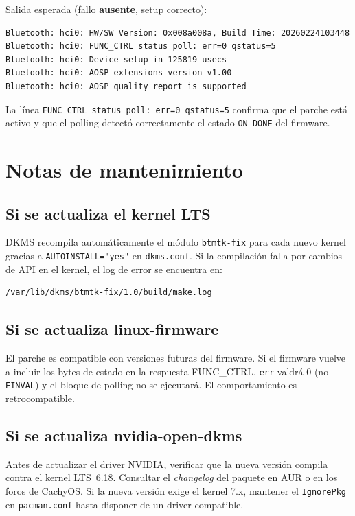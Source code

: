 \documentclass[12pt,a4paper]{article}
\begin{document}
Salida esperada (fallo \textbf{ausente}, setup correcto):

\begin{lstlisting}[style=bash]
Bluetooth: hci0: HW/SW Version: 0x008a008a, Build Time: 20260224103448
Bluetooth: hci0: FUNC_CTRL status poll: err=0 qstatus=5
Bluetooth: hci0: Device setup in 125819 usecs
Bluetooth: hci0: AOSP extensions version v1.00
Bluetooth: hci0: AOSP quality report is supported
\end{lstlisting}

La línea \texttt{FUNC\_CTRL status poll: err=0 qstatus=5} confirma que el
parche está activo y que el polling detectó correctamente el estado
\texttt{ON\_DONE} del firmware.

\section{Notas de mantenimiento}

\subsection{Si se actualiza el kernel LTS}

DKMS recompila automáticamente el módulo \texttt{btmtk-fix} para cada nuevo
kernel gracias a \texttt{AUTOINSTALL="yes"} en \texttt{dkms.conf}. Si la
compilación falla por cambios de API en el kernel, el log de error se
encuentra en:

\begin{lstlisting}[style=bash]
/var/lib/dkms/btmtk-fix/1.0/build/make.log
\end{lstlisting}

\subsection{Si se actualiza linux-firmware}

El parche es compatible con versiones futuras del firmware. Si el firmware
vuelve a incluir los bytes de estado en la respuesta FUNC\_CTRL, \texttt{err}
valdrá 0 (no \texttt{-EINVAL}) y el bloque de polling no se ejecutará. El
comportamiento es retrocompatible.

\subsection{Si se actualiza nvidia-open-dkms}

Antes de actualizar el driver NVIDIA, verificar que la nueva versión compila
contra el kernel LTS~6.18. Consultar el \emph{changelog} del paquete en AUR
o en los foros de CachyOS. Si la nueva versión exige el kernel 7.x, mantener
el \texttt{IgnorePkg} en \texttt{pacman.conf} hasta disponer de un driver
compatible.
\end{document}
